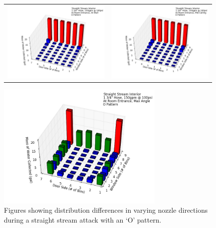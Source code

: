 \documentclass{article}
\begin{document}
\clearpage


\begin{figure}[ht]
\begin{tabular*}{\textwidth}{lr}
\includegraphics[width=3.2in]{../ADD_Analysis/Figures/15-12-09_151823_Datafile_Straight_Stream_Interior.png} &
\includegraphics[width=3.2in]{../ADD_Analysis/Figures/15-12-09_113335_Datafile_Straight_Stream_Interior.png} \\
\end{tabular*}
\centering
\includegraphics[width=3.2in]{../ADD_Analysis/Figures/15-12-09_153038_Datafile_Straight_Stream_Interior.png}
\caption{Figures showing distribution differences in varying nozzle directions during a straight stream attack with an `O' pattern.}
\label{fig:Interior_Varying_Nozzle_Direction_SS_O_Pattern}
\end{figure}
\end{document}
